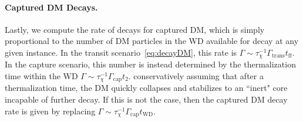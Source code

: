 \paragraph{Captured DM Decays.}
Lastly, we compute the rate of decays for captured DM, which is simply proportional to the number of DM particles in the WD available for decay at any given instance.
In the transit scenario~\eqref{eq:decayDM}, this rate is $\Gamma \sim \tau_\chi^{-1} \Gamma_\text{trans} t_\text{ff}$.
In the capture scenario, this number is instead determined by the thermalization time within the WD $\Gamma \sim \tau_\chi^{-1} \Gamma_\text{cap} t_2$.
conservatively assuming that after a thermalization time, the DM quickly collapses and stabilizes to an ``inert" core incapable of further decay.
If this is not the case, then the captured DM decay rate is given by replacing $\Gamma \sim \tau_\chi^{-1} \Gamma_\text{cap} t_\text{WD}$.

